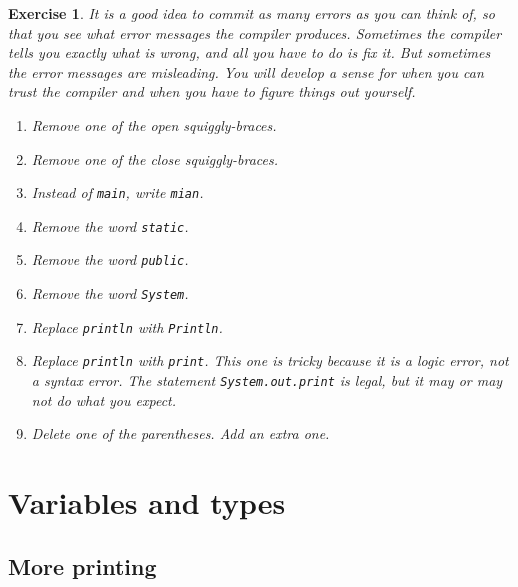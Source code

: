 \documentclass[12pt]{book}
\theoremstyle{exercise}
\newtheorem{exercise}{Exercise}[chapter]
\begin{document}
\begin{exercise}

It is a good idea to commit as many errors as you can think of,
so that you see what error messages the compiler produces.
Sometimes the compiler tells you exactly what is wrong, and all
you have to do is fix it.  But sometimes the error messages are
misleading.  You will develop a sense for when you can
trust the compiler and when you have to figure things out yourself.

\begin {enumerate}

\item Remove one of the open squiggly-braces.

\item Remove one of the close squiggly-braces.

\item Instead of {\tt main}, write {\tt mian}.

\item Remove the word {\tt static}.

\item Remove the word {\tt public}.

\item Remove the word {\tt System}.

\item Replace {\tt println} with {\tt Println}.

\item Replace {\tt println} with {\tt print}.  This one is
tricky because it is a logic error, not a syntax error.
The statement {\tt System.out.print} is legal, but it may or may
not do what you expect.

\item Delete one of the parentheses.  Add an extra one.

\end {enumerate}
\end{exercise}






\chapter{Variables and types}
\label{chap02}

\section{More printing}
\end{document}
